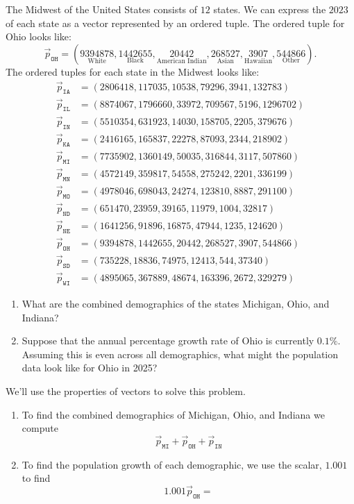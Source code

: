 \documentclass{ximera}
\begin{document}
\begin{example} %
  The Midwest of the United States consists of $12$ states. We can
  express the $2023$
  of each state as a vector represented by an ordered tuple. The
  ordered tuple for Ohio looks like:
  \[
  \vec{p}_{\texttt{OH}} = (\underset{\text{White}}{9394878},\underset{\text{Black}}{1442655},\underset{\text{American Indian}}{20442},\underset{\text{Asian}}{268527},\underset{\text{Hawaiian}}{3907},\underset{\text{Other}}{544866}).
  \]
  The ordered tuples for each state in the Midwest looks like:
\begin{align*}
  \vec{p}_{\texttt{IA}} &= (2806418,117035,10538,79296,3941,132783)\\
  \vec{p}_{\texttt{IL}} &= (8874067,1796660,33972,709567,5196,1296702)\\
  \vec{p}_{\texttt{IN}} &= (5510354,631923,14030,158705,2205,379676)\\
  \vec{p}_{\texttt{KA}} &= (2416165,165837,22278,87093,2344,218902)\\
  \vec{p}_{\texttt{MI}} &= (7735902,1360149,50035,316844,3117,507860)\\
  \vec{p}_{\texttt{MN}} &= (4572149,359817,54558,275242,2201,336199)\\
  \vec{p}_{\texttt{MO}} &= (4978046,698043,24274,123810,8887,291100)\\
  \vec{p}_{\texttt{ND}} &= (651470,23959,39165,11979,1004,32817)\\
  \vec{p}_{\texttt{NE}} &= (1641256,91896,16875,47944,1235,124620)\\
  \vec{p}_{\texttt{OH}} &= (9394878,1442655,20442,268527,3907,544866)\\
  \vec{p}_{\texttt{SD}} &= (735228,18836,74975,12413,544,37340)\\
  \vec{p}_{\texttt{WI}} &= (4895065,367889,48674,163396,2672,329279)
\end{align*}
\begin{enumerate}
\item What are the combined demographics of the states Michigan, Ohio,
  and Indiana?
\item Suppose that the annual percentage growth rate of Ohio is
  currently $0.1\%$. Assuming this is even across all demographics,
  what might the population data look like for Ohio in 2025?
\end{enumerate}
\begin{solution}
  We'll use the properties of vectors to solve this problem.
  \begin{enumerate}
  \item To find the combined demographics of Michigan, Ohio, and
    Indiana we compute
    \[
    \vec{p}_{\texttt{MI}} + \vec{p}_{\texttt{OH}} + \vec{p}_{\texttt{IN}}
    \]
  \item To find the population growth of each demographic, we use the scalar, $1.001$ to find
    \[
    1.001 \vec{p}_{\texttt{OH}} = 
    \]
  \end{enumerate}
\end{solution}
\end{example}
\end{document}
